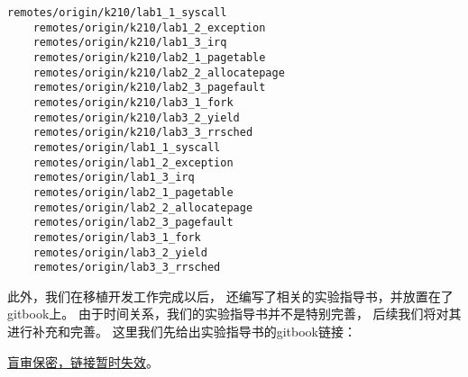 \begin{lstlisting}[caption={分支列表}, label={lst:branch_list_1}]
    remotes/origin/k210/lab1_1_syscall
    remotes/origin/k210/lab1_2_exception
    remotes/origin/k210/lab1_3_irq
    remotes/origin/k210/lab2_1_pagetable
    remotes/origin/k210/lab2_2_allocatepage
    remotes/origin/k210/lab2_3_pagefault
    remotes/origin/k210/lab3_1_fork
    remotes/origin/k210/lab3_2_yield
    remotes/origin/k210/lab3_3_rrsched
    remotes/origin/lab1_1_syscall
    remotes/origin/lab1_2_exception
    remotes/origin/lab1_3_irq
    remotes/origin/lab2_1_pagetable
    remotes/origin/lab2_2_allocatepage
    remotes/origin/lab2_3_pagefault
    remotes/origin/lab3_1_fork
    remotes/origin/lab3_2_yield
    remotes/origin/lab3_3_rrsched
\end{lstlisting}

此外，我们在移植开发工作完成以后，
还编写了相关的实验指导书，并放置在了gitbook上。
由于时间关系，我们的实验指导书并不是特别完善，
后续我们将对其进行补充和完善。
这里我们先给出实验指导书的gitbook链接：

\href{https://baidu.com}{盲审保密，链接暂时失效}。
